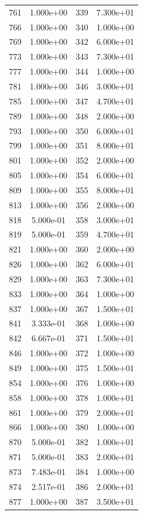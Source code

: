 \documentclass[12pt]{article}
\begin{document}
\begin{longtable}{@{}cccc@{}}
761 & 1.000e+00 & 339 & 7.300e+01 \\
766 & 1.000e+00 & 340 & 1.000e+00 \\
769 & 1.000e+00 & 342 & 6.000e+01 \\
773 & 1.000e+00 & 343 & 7.300e+01 \\
777 & 1.000e+00 & 344 & 1.000e+00 \\
781 & 1.000e+00 & 346 & 3.000e+01 \\
785 & 1.000e+00 & 347 & 4.700e+01 \\
789 & 1.000e+00 & 348 & 2.000e+00 \\
793 & 1.000e+00 & 350 & 6.000e+01 \\
799 & 1.000e+00 & 351 & 8.000e+01 \\
801 & 1.000e+00 & 352 & 2.000e+00 \\
805 & 1.000e+00 & 354 & 6.000e+01 \\
809 & 1.000e+00 & 355 & 8.000e+01 \\
813 & 1.000e+00 & 356 & 2.000e+00 \\
818 & 5.000e-01 & 358 & 3.000e+01 \\
819 & 5.000e-01 & 359 & 4.700e+01 \\
821 & 1.000e+00 & 360 & 2.000e+00 \\
826 & 1.000e+00 & 362 & 6.000e+01 \\
829 & 1.000e+00 & 363 & 7.300e+01 \\
833 & 1.000e+00 & 364 & 1.000e+00 \\
837 & 1.000e+00 & 367 & 1.500e+01 \\
841 & 3.333e-01 & 368 & 1.000e+00 \\
842 & 6.667e-01 & 371 & 1.500e+01 \\
846 & 1.000e+00 & 372 & 1.000e+00 \\
849 & 1.000e+00 & 375 & 1.500e+01 \\
854 & 1.000e+00 & 376 & 1.000e+00 \\
858 & 1.000e+00 & 378 & 1.000e+01 \\
861 & 1.000e+00 & 379 & 2.000e+01 \\
866 & 1.000e+00 & 380 & 1.000e+00 \\
870 & 5.000e-01 & 382 & 1.000e+01 \\
871 & 5.000e-01 & 383 & 2.000e+01 \\
873 & 7.483e-01 & 384 & 1.000e+00 \\
874 & 2.517e-01 & 386 & 2.000e+01 \\
877 & 1.000e+00 & 387 & 3.500e+01 \\

\end{longtable}
\end{document}
